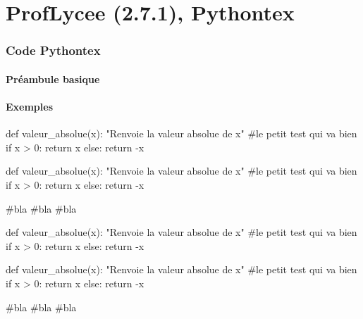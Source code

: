 \documentclass[french,a4paper,10pt]{article}
\def\PLver{2.7.1}
\begin{document}
\part*{ProfLycee (\PLver), Pythontex}

\section{Code \og Pythontex \fg{}}

\subsection{Préambule basique}

{\small {}}

\subsection{Exemples}

{\small \begin{codehigh}
\begin{CodePythontex}{}
def valeur_absolue(x):
    "Renvoie la valeur absolue de x"
    #le petit test qui va bien
    if x > 0:
        return x
    else:
    return -x
\end{CodePythontex}
\end{codehigh}}

\begin{CodePythontex}{}
def valeur_absolue(x):
	"Renvoie la valeur absolue de x"
	#le petit test qui va bien
	if x > 0:
		return x
	else:
		return -x

#bla
#bla
#bla
\end{CodePythontex}

{\small \begin{codehigh}
\begin{CodePythontexAlt}[Largeur=10cm,Centre]{}
def valeur_absolue(x):
    "Renvoie la valeur absolue de x"
    #le petit test qui va bien
    if x > 0:
        return x
    else:
    return -x
\end{CodePythontexAlt}
\end{codehigh}}

\begin{CodePythontexAlt}[Largeur=10cm,Centre]{}
def valeur_absolue(x):
	"Renvoie la valeur absolue de x"
	#le petit test qui va bien
	if x > 0:
		return x
	else:
		return -x

#bla
#bla
#bla
\end{CodePythontexAlt}
\end{document}
